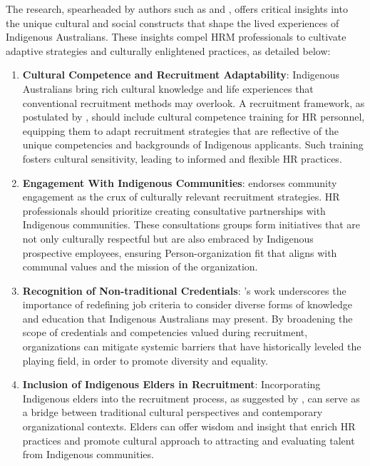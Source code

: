 \documentclass{article}
\begin{document}
The research, spearheaded by authors such as \textcite{pearsonExtendingBoundariesHuman2011} and \cite{raeDevelopingResearchPartnership2013}, offers critical insights into the unique cultural and social constructs that shape the lived experiences of Indigenous Australians. These insights compel HRM professionals to cultivate adaptive strategies and culturally enlightened practices, as detailed below:

\begin{enumerate}
    \item \textbf{Cultural Competence and Recruitment Adaptability}: Indigenous Australians bring rich cultural knowledge and life experiences that conventional recruitment methods may overlook. A recruitment framework, as postulated by \textcite{pearsonExtendingBoundariesHuman2011}, should include cultural competence training for HR personnel, equipping them to adapt recruitment strategies that are reflective of the unique competencies and backgrounds of Indigenous applicants. Such training fosters cultural sensitivity, leading to informed and flexible HR practices.
    
    \item \textbf{Engagement With Indigenous Communities}: \textcite{raeDevelopingResearchPartnership2013} endorses community engagement as the crux of culturally relevant recruitment strategies. HR professionals should prioritize creating consultative partnerships with Indigenous communities. These consultations groups form initiatives that are not only culturally respectful but are also embraced by Indigenous prospective employees, ensuring Person-organization fit that aligns with communal values and the mission of the organization.

    \item \textbf{Recognition of Non-traditional Credentials}: \textcite{pearsonExtendingBoundariesHuman2011}'s work underscores the importance of redefining job criteria to consider diverse forms of knowledge and education that Indigenous Australians may present. By broadening the scope of credentials and competencies valued during recruitment, organizations can mitigate systemic barriers that have historically leveled the playing field, in order to promote diversity and equality.

    \item \textbf{Inclusion of Indigenous Elders in Recruitment}: Incorporating Indigenous elders into the recruitment process, as suggested by \textcite{raeDevelopingResearchPartnership2013}, can serve as a bridge between traditional cultural perspectives and contemporary organizational contexts. Elders can offer wisdom and insight that enrich HR practices and promote cultural approach to attracting and evaluating talent from Indigenous communities.


\end{enumerate}
\end{document}

